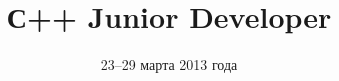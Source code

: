 \documentclass[mathserif,utf8,xcolor=table,14pt]{beamer}
\title{С++ Junior Developer}
\institute{Уфа}
\date[март 2013]{23--29 марта 2013 года}
\begin{document}
\begin{frame}
\titlepage
\end{frame}

%
%
%
%
%


%

%

%
%
\end{document}
